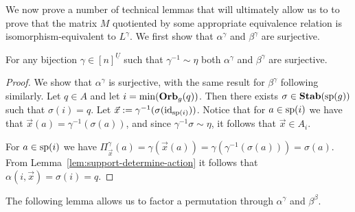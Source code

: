 \documentclass[../paper.tex]{subfiles}
\begin{document}
We now prove a number of technical lemmas that will ultimately allow us to to
prove that the matrix $M$ quotiented by some appropriate equivalence relation is
isomorphism-equivalent to $L^{\gamma}$. We first show that $\alpha^{\gamma}$ and
$\beta^{\gamma}$ are surjective.

\begin{lem} 
	For any bijection $\gamma \in [n]^{\underline{U}}$ such that $\gamma^{-1} \sim
  \eta$ both $\alpha^{\gamma}$ and $\beta^{\gamma}$ are surjective.
  \label{lem:alpha-beta-surjective}
\end{lem}
\begin{proof}
	We show that $\alpha^{\gamma}$ is surjective, with the same result for
  $\beta^{\gamma}$ following similarly. Let $q \in A$ and let $i = \min
  (\text{\textbf{Orb}}_{g} (q))$. Then there exists $\sigma \in \text{\textbf{Stab}} (\text{sp} (g))$ such that $\sigma
  (i) = q$. Let $\vec{x} := \gamma^{-1} (\sigma (\operatorname{id}_{\text{sp}(i)}))$. Notice that
  for $a \in \text{sp}(i)$ we have that $\vec{x}(a) = \gamma^{-1} (\sigma (a))$,
  and since $\gamma^{-1} \sigma \sim \eta$, it follows that $\vec{x} \in A_i$.
		
	For $a \in \text{sp}(i)$ we have $\Pi^{\gamma}_{\vec{x}} (a) = \gamma
  (\vec{x}(a)) = \gamma (\gamma^{-1} (\sigma (a))) = \sigma (a)$. From
  Lemma~\ref{lem:support-determine-action} it follows that $\alpha(i, \vec{x}) =
  \sigma(i) = q$.
\end{proof}




The following lemma allows us to factor a permutation through $\alpha^{\gamma}$
and $\beta^{\beta}$.
\end{document}
